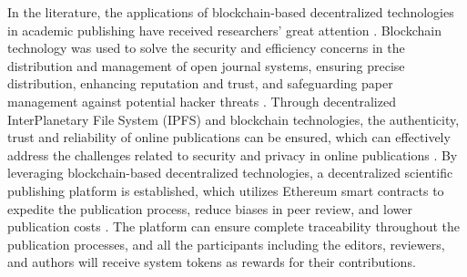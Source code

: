 \documentclass[lettersize,journal]{IEEEtran}
\begin{document}
In the literature, the applications of blockchain-based decentralized technologies in academic publishing have received researchers' great attention \cite{8756390}. Blockchain technology was used to solve the security and efficiency concerns in the distribution and management of open journal systems, ensuring precise distribution, enhancing reputation and trust, and safeguarding paper management against potential hacker threats \cite{agustin2020blockchain}. Through decentralized InterPlanetary File System (IPFS) and blockchain technologies, the authenticity, trust and reliability of online publications can be ensured, which can effectively address the challenges related to security and privacy in online publications \cite{nizamuddin2018ipfs}. By leveraging blockchain-based decentralized technologies, a decentralized scientific publishing platform is established, which utilizes Ethereum smart contracts to expedite the publication process, reduce biases in peer review, and lower publication costs \cite{becstacs2023novel}. The platform can ensure complete traceability throughout the publication processes, and all the participants including the editors, reviewers, and authors will receive system tokens as rewards for their contributions.
\end{document}
